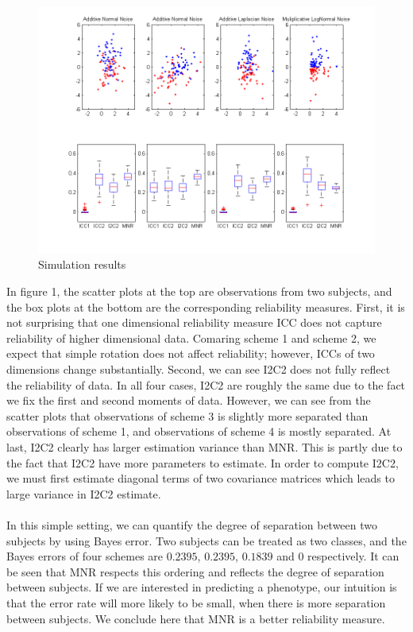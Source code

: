 \documentclass{article}
\begin{document}
\begin{figure}[t!]
\begin{center}
\includegraphics[width=5in]{Simu1}
\end{center}
\caption{Simulation results}
\end{figure}

\noindent In figure 1, the scatter plots at the top are observations from two subjects, and the box plots at the bottom are the corresponding reliability measures. First, it is not surprising that one dimensional reliability measure ICC does not capture reliability of higher dimensional data. Comaring scheme 1 and scheme 2, we expect that simple rotation does not affect reliability; however, ICCs of two dimensions change substantially. Second, we can see I2C2 does not fully reflect the reliability of data. In all four cases, I2C2 are roughly the same due to the fact we fix the first and second moments of data. However, we can see from the scatter plots that observations of scheme 3 is slightly more separated than observations of scheme 1, and observations of scheme 4 is mostly separated. At last, I2C2 clearly has larger estimation variance than MNR. This is partly due to the fact that I2C2 have more parameters to estimate. In order to compute I2C2, we must first estimate diagonal terms of two covariance matrices which leads to large variance in I2C2 estimate.   \\
\\
In this simple setting, we can quantify the degree of separation between two subjects by using Bayes error. Two subjects can be treated as two classes, and the Bayes errors of four schemes are $0.2395$, $0.2395$, $0.1839$ and $0$ respectively. It can be seen that MNR respects this ordering and reflects the degree of separation between subjects.   If we are interested in predicting a phenotype, our intuition is that the error rate will more likely to be small, when there is more separation between subjects. We conclude here that MNR is a better reliability measure.
\end{document}
